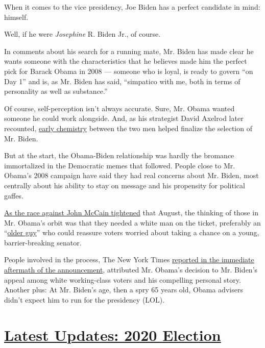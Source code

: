 When it comes to the vice presidency, Joe Biden has a perfect candidate
in mind: himself.

Well, if he were \emph{Josephine} R. Biden Jr., of course.

In comments about his search for a running mate, Mr. Biden has made
clear he wants someone with the characteristics that he believes made
him the perfect pick for Barack Obama in 2008 --- someone who is loyal,
is ready to govern ``on Day 1'' and is, as Mr. Biden has said,
``simpatico with me, both in terms of personality as well as
substance.''

Of course, self-perception isn't always accurate. Sure, Mr. Obama wanted
someone he could work alongside. And, as his strategist David Axelrod
later recounted,
\href{https://www.usatoday.com/story/news/politics/onpolitics/2015/02/10/biden-vice-president-bayh-axelrod/81211852/}{early
chemistry} between the two men helped finalize the selection of Mr.
Biden.

But at the start, the Obama-Biden relationship was hardly the bromance
immortalized in the Democratic memes that followed. People close to Mr.
Obama's 2008 campaign have said they had real concerns about Mr. Biden,
most centrally about his ability to stay on message and his propensity
for political gaffes.

\href{https://blogs.wsj.com/washwire/2008/08/13/mccain-obama-race-enters-dead-heat/}{As
the race against John McCain tightened} that August, the thinking of
those in Mr. Obama's orbit was that they needed a white man on the
ticket, preferably an
``\href{https://www.nytimes3xbfgragh.onion/2019/08/16/us/politics/biden-obama-history.html}{older
guy}'' who could reassure voters worried about taking a chance on a
young, barrier-breaking senator.

People involved in the process, The New York Times
\href{https://www.nytimes3xbfgragh.onion/2008/08/24/us/politics/24deconstruct.html?_r=1\&hp=\&adxnnl=1\&oref=slogin\&adxnnlx=1219585399-mopoNQ9Taivokt1V0PHsig}{reported
in the immediate aftermath of the announcement}, attributed Mr. Obama's
decision to Mr. Biden's appeal among white working-class voters and his
compelling personal story. Another plus: At Mr. Biden's age, then a spry
65 years old, Obama advisers didn't expect him to run for the presidency
(LOL).

\hypertarget{latest-updates-2020-election}{%
\section{\texorpdfstring{\href{https://www.nytimes3xbfgragh.onion/2020/08/03/us/elections/biden-vs-trump.html?action=click\&pgtype=Article\&state=default\&region=MAIN_CONTENT_1\&context=storylines_live_updates}{Latest
Updates: 2020
Election}}{Latest Updates: 2020 Election}}\label{latest-updates-2020-election}}

